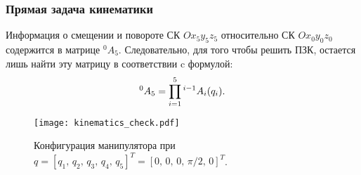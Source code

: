 \subsubsection{Прямая задача кинематики}\label{part_kinematics_forward}
Информация о смещении и повороте СК $Ox_5y_5z_5$ относительно СК $Ox_0y_0z_0$ содержится в матрице ${}^0A_5$.
Следовательно, для того чтобы решить ПЗК, остается лишь найти эту матрицу в соответствии c формулой:
\begin{equation}\label{fk}
	{}^0A_5 = \prod^{5}_{i=1}{{}^{i-1}A_i(q_i)}\ldotp
\end{equation}

\begin{figure}[h]
	\centering
	\texttt{[image: kinematics\_check.pdf]}
	\caption{Конфигурация манипулятора при $q=\left[q_1,\,q_2,\,q_3,\,q_4,\,q_5\right]^T = \left[0,\,0,\,0,\,\pi/2,\,0\right]^T$.}
	\label{kinematics_check}
\end{figure}

